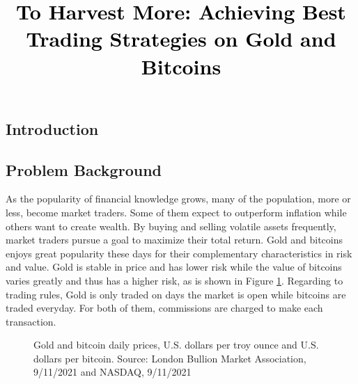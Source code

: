 \documentclass[12pt,a4paper]{article}
\newcommand{\PaperTitle}{To Harvest More: Achieving Best Trading Strategies on Gold and Bitcoins}  %
\begin{document}
\thispagestyle{empty}


\newpage

\title{
\Large{\textcolor{black}{\PaperTitle}}
}




\maketitle



\tableofcontents
\setcounter{tocdepth}{2}

\newpage
\setcounter{page}{1}


\begin{spacing}{1.2} 



\section{Introduction}
\label{Problem_Statement}

\subsection{Problem Background}
As the popularity of financial knowledge grows, many of the population, more or less, become market traders. Some of them expect to outperform inflation while others want to create wealth. By buying and selling volatile assets frequently, market traders pursue a goal to maximize their total return. Gold and bitcoins enjoys great popularity these days for their complementary characteristics in risk and value. Gold is stable in price and has lower risk while the value of bitcoins varies greatly and thus has a higher risk, as is shown in Figure \ref{figure:prices2in1}. Regarding to trading rules, Gold is only traded on days the market is open while bitcoins are traded everyday. For both of them, commissions are charged to make each transaction.

\begin{figure}[H]
	\caption{Gold and bitcoin daily prices, U.S. dollars per troy ounce and U.S. dollars per bitcoin. Source: London Bullion Market 
		Association, 9/11/2021 and NASDAQ, 9/11/2021 }
	\label{figure:prices2in1}
\end{figure}


\end{spacing}
\end{document}
